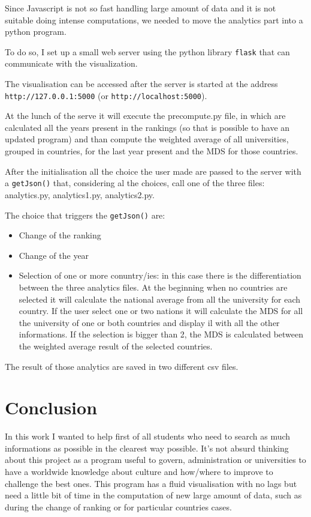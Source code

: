\documentclass[journal]{vgtc}                %
\begin{document}
Since Javascript is not so fast handling large amount of data and it is not suitable doing intense computations, we needed to move the analytics part into a python program.

To do so, I set up a small web server using the python library \texttt{flask} that can communicate with the visualization.

The visualisation can be accessed after the server is started at the address \texttt{http://127.0.0.1:5000} (or \texttt{http://localhost:5000}). 

At the lunch of the serve it will execute the precompute.py file, in which are calculated all the years present in the rankings (so that is possible to have an updated program) and than compute the weighted average of all universities, grouped in countries, for the last year present and the MDS for those countries.

After the initialisation all the choice the user made are passed to the server with a   \texttt{getJson()} that, considering al the choices, call one of the three files: analytics.py, analytics1.py, analytics2.py.

The choice that triggers the  \texttt{getJson()} are: 
\begin{itemize}
\item Change of the ranking
\item Change of the year
\item Selection of one or more conuntry/ies: in this case there is the differentiation between the three analytics files.
At the beginning when no countries are selected it will calculate the national average from all the university for each country. If the user select one or two nations it will calculate the MDS for all the university of one or both countries and display il with all the other informations. If the selection is bigger than 2, the MDS is calculated between the weighted average result of the selected countries.
\end{itemize}

The result of those analytics are saved in two different csv files. 



\section{Conclusion}

In this work I wanted to help first of all students who need to search as much informations as possible in the clearest way possible. It's not absurd thinking about this project as a program useful to govern, administration or universities to have a worldwide knowledge about culture and how/where to improve to challenge the best ones.
This program has a fluid visualisation with no lags but need a little bit of time in the computation of new large amount of data, such as during the change of ranking or for particular countries cases.



\end{document}
